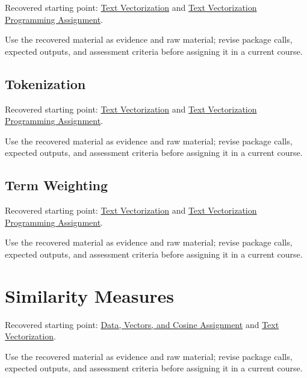 \documentclass[
  letterpaper,
]{scrbook}
\begin{document}

Recovered starting point: \hyperref[sec-lab-text-vectorization]{Text
Vectorization} and \hyperref[sec-lab-text-vectorization-assignment]{Text
Vectorization Programming Assignment}.

Use the recovered material as evidence and raw material; revise package
calls, expected outputs, and assessment criteria before assigning it in
a current course.

\subsection*{Tokenization}\label{sec-pr-11-tokenization}

Recovered starting point: \hyperref[sec-lab-text-vectorization]{Text
Vectorization} and \hyperref[sec-lab-text-vectorization-assignment]{Text
Vectorization Programming Assignment}.

Use the recovered material as evidence and raw material; revise package
calls, expected outputs, and assessment criteria before assigning it in
a current course.

\subsection*{Term Weighting}\label{sec-pr-11-term-weighting}

Recovered starting point: \hyperref[sec-lab-text-vectorization]{Text
Vectorization} and \hyperref[sec-lab-text-vectorization-assignment]{Text
Vectorization Programming Assignment}.

Use the recovered material as evidence and raw material; revise package
calls, expected outputs, and assessment criteria before assigning it in
a current course.

\section*{Similarity Measures}\label{sec-pr-11-similarity-measures}


Recovered starting point:
\hyperref[sec-lab-data-initialization-assignment]{Data, Vectors, and
Cosine Assignment} and \hyperref[sec-lab-text-vectorization]{Text
Vectorization}.

Use the recovered material as evidence and raw material; revise package
calls, expected outputs, and assessment criteria before assigning it in
a current course.
\end{document}
